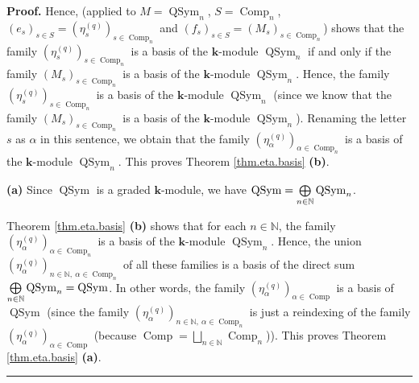 \documentclass[numbers=enddot,12pt,final,onecolumn,notitlepage]{scrartcl}%
\theoremstyle{definition}
\newenvironment{proof}[1][Proof]{\noindent\textbf{#1.} }{\ \rule{0.5em}{0.5em}}
\let\oplusnonlimits\bigoplus
\renewcommand{\bigoplus}{\oplusnonlimits\limits}
\newenvironment{verlong}{}{}
\begin{document}
\begin{verlong}
\begin{proof}
Hence, \cite[Corollary 11.1.19 (e)]{GriRei} (applied to
$M=\operatorname*{QSym}\nolimits_{n}$, $S=\operatorname*{Comp}\nolimits_{n}$,
$\left(  e_{s}\right)  _{s\in S}=\left(  \eta_{s}^{\left(  q\right)  }\right)
_{s\in\operatorname*{Comp}\nolimits_{n}}$ and $\left(  f_{s}\right)  _{s\in
S}=\left(  M_{s}\right)  _{s\in\operatorname*{Comp}\nolimits_{n}}$) shows that
the family $\left(  \eta_{s}^{\left(  q\right)  }\right)  _{s\in
\operatorname*{Comp}\nolimits_{n}}$ is a basis of the $\mathbf{k}$-module
$\operatorname*{QSym}\nolimits_{n}$ if and only if the family $\left(
M_{s}\right)  _{s\in\operatorname*{Comp}\nolimits_{n}}$ is a basis of the
$\mathbf{k}$-module $\operatorname*{QSym}\nolimits_{n}$. Hence, the family
$\left(  \eta_{s}^{\left(  q\right)  }\right)  _{s\in\operatorname*{Comp}%
\nolimits_{n}}$ is a basis of the $\mathbf{k}$-module $\operatorname*{QSym}%
\nolimits_{n}$ (since we know that the family $\left(  M_{s}\right)
_{s\in\operatorname*{Comp}\nolimits_{n}}$ is a basis of the $\mathbf{k}%
$-module $\operatorname*{QSym}\nolimits_{n}$). Renaming the letter $s$ as
$\alpha$ in this sentence, we obtain that the family $\left(  \eta_{\alpha
}^{\left(  q\right)  }\right)  _{\alpha\in\operatorname*{Comp}\nolimits_{n}}$
is a basis of the $\mathbf{k}$-module $\operatorname*{QSym}\nolimits_{n}$.
This proves Theorem \ref{thm.eta.basis} \textbf{(b)}. \medskip

\textbf{(a)} Since $\operatorname*{QSym}$ is a graded $\mathbf{k}$-module, we
have $\operatorname*{QSym}=\bigoplus\limits_{n\in\mathbb{N}}%
\operatorname*{QSym}\nolimits_{n}$.

Theorem \ref{thm.eta.basis} \textbf{(b)} shows that for each $n\in\mathbb{N}$,
the family $\left(  \eta_{\alpha}^{\left(  q\right)  }\right)  _{\alpha
\in\operatorname*{Comp}\nolimits_{n}}$ is a basis of the $\mathbf{k}$-module
$\operatorname*{QSym}\nolimits_{n}$. Hence, the union $\left(  \eta_{\alpha
}^{\left(  q\right)  }\right)  _{n\in\mathbb{N},\ \alpha\in
\operatorname*{Comp}\nolimits_{n}}$ of all these families is a basis of the
direct sum $\bigoplus\limits_{n\in\mathbb{N}}\operatorname*{QSym}%
\nolimits_{n}=\operatorname*{QSym}$. In other words, the family $\left(
\eta_{\alpha}^{\left(  q\right)  }\right)  _{\alpha\in\operatorname*{Comp}}$
is a basis of $\operatorname*{QSym}$ (since the family $\left(  \eta_{\alpha
}^{\left(  q\right)  }\right)  _{n\in\mathbb{N},\ \alpha\in
\operatorname*{Comp}\nolimits_{n}}$ is just a reindexing of the family
$\left(  \eta_{\alpha}^{\left(  q\right)  }\right)  _{\alpha\in
\operatorname*{Comp}}$ (because $\operatorname*{Comp}=\bigsqcup\limits_{n\in
\mathbb{N}}\operatorname*{Comp}\nolimits_{n}$)). This proves Theorem
\ref{thm.eta.basis} \textbf{(a)}.
\end{proof}
\end{verlong}
\end{document}
